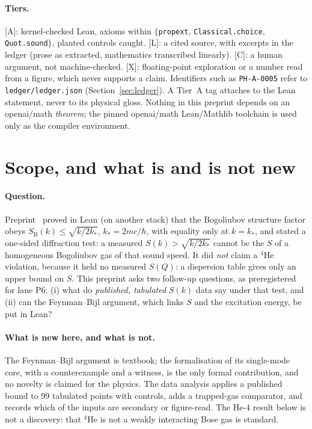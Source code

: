 \documentclass[11pt]{article}
\theoremstyle{remark}
\newcommand{\tier}[1]{\textsf{[#1]}}
\newcommand{\lean}[1]{\texttt{#1}}
\newcommand{\ks}{k_*}
\newcommand{\hb}{\hbar}
\newcommand{\SB}{S_{\mathrm B}}
\begin{document}
\paragraph{Tiers.} \tier{A}: kernel-checked Lean, axioms within $\{$\lean{propext}, \lean{Classical.choice}, \lean{Quot.sound}$\}$,
planted controls caught. \tier{L}: a cited source, with excerpts in the ledger (prose as extracted, mathematics transcribed linearly). \tier{C}: a human argument, not machine-checked.
\tier{X}: floating-point exploration or a number read from a figure, which never supports a claim. Identifiers such as
\texttt{PH-A-0005} refer to \texttt{ledger/ledger.json} (Section~\ref{sec:ledger}). A Tier~A tag attaches to the Lean statement,
never to its physical gloss. Nothing in this preprint depends on an openai/math \emph{theorem}; the pinned openai/math
Lean/Mathlib toolchain is used only as the compiler environment.

\section{Scope, and what is and is not new}\label{sec:scope}
\paragraph{Question.} Preprint~\cite{bsk} proved in Lean (on another stack) that the Bogoliubov structure factor obeys
$\SB(k)\le\sqrt{k/2\ks}$, $\ks=2mc/\hb$, with equality only at $k=\ks$, and stated a one-sided diffraction test: a measured
$S(k)>\sqrt{k/2\ks}$ cannot be the $S$ of a homogeneous Bogoliubov gas of that sound speed. It did \emph{not} claim a $^4$He
violation, because it held no measured $S(Q)$: a dispersion table gives only an upper bound on $S$. This preprint asks two
follow-up questions, as preregistered for lane P6: (i) what do \emph{published, tabulated} $S(k)$ data say under that test,
and (ii) can the Feynman--Bijl argument, which links $S$ and the excitation energy, be put in Lean?

\paragraph{What is new here, and what is not.} The Feynman--Bijl argument is textbook; the formalisation of its single-mode
core, with a counterexample and a witness, is the only formal contribution, and no novelty is claimed for the physics. The data
analysis applies a published bound to 99 tabulated points with controls, adds a trapped-gas comparator, and records which of the
inputs are secondary or figure-read. The He-4 result below is not a discovery: that $^4$He is not a weakly interacting Bose
gas is standard.
\end{document}
